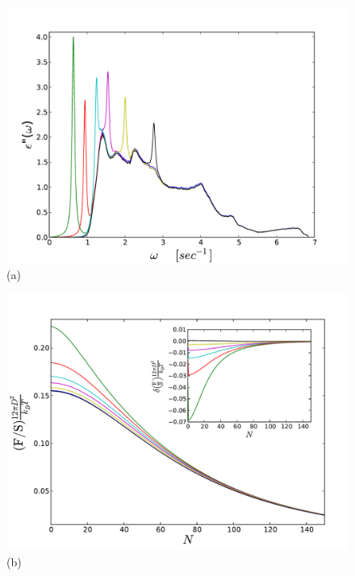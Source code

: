 \documentclass[letterpaper,twocolumn,amsmath,amssymb,floatfix,aps,superscriptaddress]{revtex4}
\begin{document}
\begin{figure}[t!]
\begin{center}
\begin{minipage}[b]{0.45\textwidth}
\begin{center}
\includegraphics[width=1.2\textwidth]{./130807_plots/fig4a_shifted_peaks_eps2.pdf} (a)
\end{center}
\end{minipage}
\hskip 34pt
\begin{minipage}[b]{0.45\textwidth}
\begin{center}
\includegraphics[width=1.2\textwidth]{./130807_plots/fig4b_shifted_peaks_F_dF.pdf} (b)
\end{center}
\end{minipage}

\end{center}
\end{figure}
\end{document}
